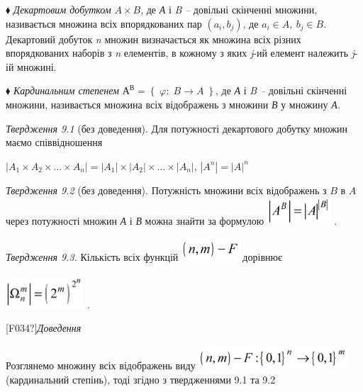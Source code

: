 \documentclass[a4paper]{article}
\newcounter{}
\begin{document}
${\blacklozenge}$ \textit{Декартовим добутком}  ${A\times B}$, де
\textit{А}\textit{ }і \textit{B}\textit{ }\textit{– }довільні скінченні
множини, називається множина всіх впорядкованих пар 
${\left(a_{{i}},b_{{j}}\right)}$, де  ${a_{{i}}\in A,\ b_{{j}}\in B}$. 
Декартовий добуток  \textit{n} множин визначається як множина всіх різних
впорядкованих наборів з \textit{n}\textit{ }елементів, в кожному з яких 
\textit{j}{}-ий елемент належить \textit{j}{}-ій  множині.

${\blacklozenge}$ \textit{Кардинальним степенем }
${\text{А}^{{\text{В}}}=\left\{\;\varphi :\;B\rightarrow A\;\right\}}$, де
\textit{А }і \textit{B }\textit{– }довільні скінченні множини, називається
множина всіх відображень з множини \textit{В} у множину  \textit{А. } 

\textit{Твердження 9.1} (без доведення). Для потужності декартового добутку
множин маємо співвідношення 

 ${|A_{{1}}\times A_{{2}}\times \text{.}\text{.}\text{.}\times
A_{{n}}|=|A_{{1}}|\times |A_{{2}}|\times \text{.}\text{.}\text{.}\times
|A_{{n}}|}$,   ${|A^{{n}}|=|A|^{{n}}}$


\bigskip

\textit{Твердження 9.2} (без доведення).\textit{ }Потужність множини всіх
відображень з   ${B}$\textit{ }в\textit{ } ${A}$  через потужності  множин 
\textit{А  }і  \textit{В}  можна знайти за формулою  
\includegraphics[width=0.9354in,height=0.4055in]{crypt-img/crypt-img94.png} . 

\textit{Твердження 9.3. }Кількість всіх функцій 
\includegraphics[width=0.8508in,height=0.3346in]{crypt-img/crypt-img95.png} 
дорівнює 

{\centering
 \includegraphics[width=1.1457in,height=0.5in]{crypt-img/crypt-img96.png} .
\par}

\textlatin{[F034?]}\textit{Доведення} 

Розглянемо множину всіх відображень виду 
\includegraphics[width=2.1925in,height=0.3583in]{crypt-img/crypt-img97.png} 
(кардинальний степінь), тоді згідно з твердженнями 9.1 та 9.2
\end{document}
